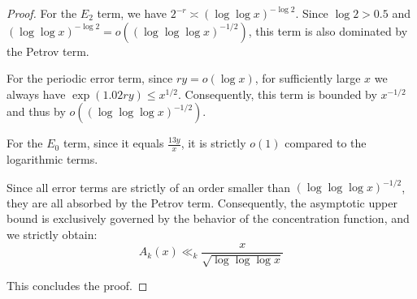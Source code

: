\documentclass[10pt,a4paper]{amsart}
\begin{document}
\begin{proof}
For the $E_2$ term, we have $2^{-r} \asymp (\log \log x)^{-\log 2}$. Since  $\log 2 > 0.5$ and $(\log \log x)^{-\log 2} = o((\log \log \log x)^{-1/2})$, this term is also dominated by the Petrov term.

For the periodic error term, since $ry = o(\log x)$, for sufficiently large $x$ we always have $\exp(1.02ry) \leq x^{1/2}$. Consequently, this term is bounded by $x^{-1/2}$ and thus by $o((\log \log \log x)^{-1/2})$.

For the $E_0$ term, since it equals $\frac{13y}{x}$, it is strictly $o(1)$ compared to the logarithmic terms.

Since all error terms are strictly of an order smaller than $(\log \log \log x)^{-1/2}$, they are all absorbed by the Petrov term. Consequently, the asymptotic upper bound is exclusively governed by the behavior of the concentration function, and we strictly obtain:
\[ A_k(x) \ll_k \frac{x}{\sqrt{\log \log \log x}} \]

This concludes the proof.
\end{proof}
\end{document}
